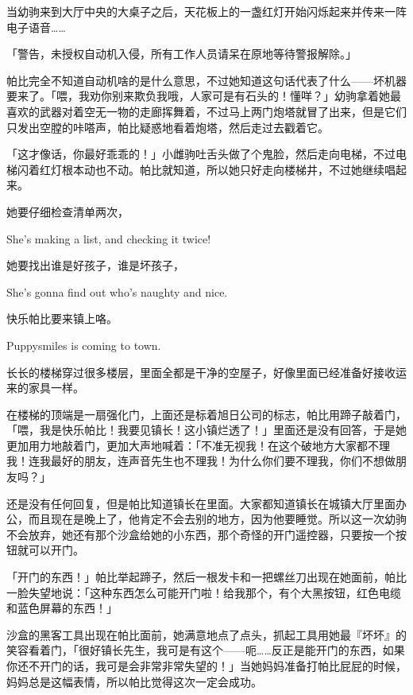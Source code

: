 当幼驹来到大厅中央的大桌子之后，天花板上的一盏红灯开始闪烁起来并传来一阵电子语音……

「{\mt 警告，未授权自动机入侵，所有工作人员请呆在原地等待警报解除。}」

帕比完全不知道自动机啥的是什么意思，不过她知道这句话代表了什么——坏机器要来了。「喂，我劝你别来欺负我哦，人家可是有石头的！懂咩？」幼驹拿着她最喜欢的武器对着空无一物的走廊挥舞着，不过马上两门炮塔就冒了出来，但是它们只发出空膛的咔嗒声，帕比疑惑地看着炮塔，然后走过去戳着它。

「这才像话，你最好乖乖的！」小雌驹吐舌头做了个鬼脸，然后走向电梯，不过电梯闪着红灯根本动也不动。帕比就知道，所以她只好走向楼梯井，不过她继续唱起来。

\begin{song}
她要仔细检查清单两次，

She's making a list, and checking it twice!

\medskip

她要找出谁是好孩子，谁是坏孩子，

She's gonna find out who's naughty and nice.

\medskip

快乐帕比要来镇上咯。

Puppysmiles is coming to town.
\end{song}

长长的楼梯穿过很多楼层，里面全都是干净的空屋子，好像里面已经准备好接收运来的家具一样。

在楼梯的顶端是一扇强化门，上面还是标着旭日公司的标志，帕比用蹄子敲着门，「喂，我是快乐帕比！我要见镇长！这小镇烂透了！」里面还是没有回答，于是她更加用力地敲着门，更加大声地喊着：「不准无视我！在这个破地方大家都不理我！连我最好的朋友，连声音先生也不理我！为什么你们要不理我，你们不想做朋友吗？」

还是没有任何回复，但是帕比知道镇长在里面。大家都知道镇长在城镇大厅里面办公，而且现在是晚上了，他肯定不会去别的地方，因为他要睡觉。所以这一次幼驹不会放弃，她还有那个沙盒给她的小东西，那个奇怪的开门遥控器，只要按一个按钮就可以开门。

「开门的东西！」帕比举起蹄子，然后一根发卡和一把螺丝刀出现在她面前，帕比一脸失望地说：「这种东西怎么可能开门啦！给我那个，有个大黑按钮，红色电缆和蓝色屏幕的东西！」

沙盒的黑客工具出现在帕比面前，她满意地点了点头，抓起工具用她最『坏坏』的笑容看着门，「很好镇长先生，我可是有这个——呃……反正是能开门的东西，如果你还不开门的话，我可是会非常非常失望的！」当她妈妈准备打帕比屁屁的时候，妈妈总是这幅表情，所以帕比觉得这次一定会成功。

